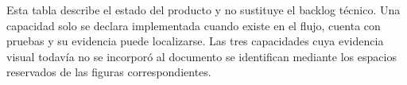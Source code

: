 Esta tabla describe el estado del producto y no sustituye el backlog técnico. Una capacidad solo se declara implementada cuando existe en el flujo, cuenta con pruebas y su evidencia puede localizarse. Las tres capacidades cuya evidencia visual todavía no se incorporó al documento se identifican mediante los espacios reservados de las figuras correspondientes.

